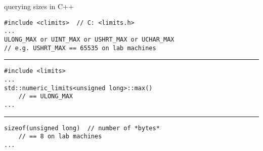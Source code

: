 \begin{frame}[fragile,label=querySize]{querying sizes in C++}
\lstset{language=C++,style=smaller}
\begin{lstlisting}
#include <climits>  // C: <limits.h>
...
ULONG_MAX or UINT_MAX or USHRT_MAX or UCHAR_MAX
// e.g. USHRT_MAX == 65535 on lab machines
\end{lstlisting}
\hrule
\vspace{.5cm}
\begin{lstlisting}
#include <limits>  
...
std::numeric_limits<unsigned long>::max()
    // == ULONG_MAX
...
\end{lstlisting}
\vspace{.5cm}
\hrule
\begin{lstlisting}
sizeof(unsigned long)  // number of *bytes* 
    // == 8 on lab machines
...
\end{lstlisting}
\end{frame}
